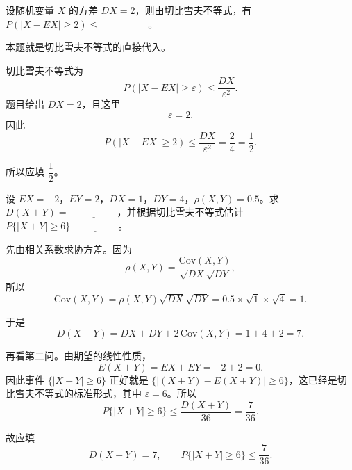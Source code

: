 ﻿\documentclass[lang=cn,11pt]{elegantbook}
\begin{document}
\begin{exercise}\label{exer:5-chebyshev-basic}
设随机变量 \(X\) 的方差 \(DX = 2\)，则由切比雪夫不等式，有 \(P(|X - EX| \geq 2) \leq\,\underline{\hspace{2cm}}\)。
\end{exercise}
\begin{solution}
本题就是切比雪夫不等式的直接代入。

切比雪夫不等式为
\[
P(|X-EX|\ge \varepsilon)\le \frac{DX}{\varepsilon^2}.
\]
题目给出 \(DX=2\)，且这里
\[
\varepsilon=2.
\]
因此
\[
P(|X - EX| \geq 2) \leq \frac{DX}{\varepsilon^2} = \frac{2}{4} = \frac{1}{2}.
\]

所以应填 \(\dfrac12\)。
\end{solution}

\begin{exercise}\label{exer:5-chebyshev-sum}
设 \(EX = -2\)，\(EY = 2\)，\(DX = 1\)，\(DY = 4\)，\(\rho(X,Y) = 0.5\)。求 \(D(X+Y) =\,\underline{\hspace{2cm}}\)，并根据切比雪夫不等式估计 \(P\{|X+Y| \geq 6\}\,\underline{\hspace{2cm}}\)。
\end{exercise}
\begin{solution}
先由相关系数求协方差。因为
\[
\rho(X,Y)=\frac{\mathrm{Cov}(X,Y)}{\sqrt{DX}\sqrt{DY}},
\]
所以
\[
\mathrm{Cov}(X,Y)=\rho(X,Y)\sqrt{DX}\sqrt{DY}
=0.5\times \sqrt{1}\times \sqrt{4}=1.
\]

于是
\[
D(X+Y) = DX + DY + 2\,\mathrm{Cov}(X,Y) = 1 + 4 + 2 = 7.
\]

再看第二问。由期望的线性性质，
\[
E(X+Y)=EX+EY=-2+2=0.
\]
因此事件 \(\{|X+Y|\ge 6\}\) 正好就是 \(\{|(X+Y)-E(X+Y)|\ge 6\}\)，这已经是切比雪夫不等式的标准形式，其中 \(\varepsilon=6\)。所以
\[
P\{|X+Y| \geq 6\} \leq \frac{D(X+Y)}{36} = \frac{7}{36}.
\]

故应填
\[
D(X+Y)=7,\qquad P\{|X+Y|\ge 6\}\le \frac{7}{36}.
\]
\end{solution}
\end{document}
